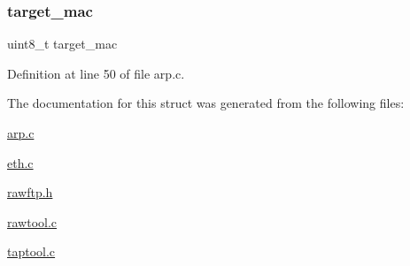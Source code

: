 \subsubsection{\texorpdfstring{target\+\_\+mac}{target\_mac}}
{\footnotesize\ttfamily uint8\+\_\+t target\+\_\+mac}



Definition at line 50 of file arp.\+c.



The documentation for this struct was generated from the following files\+:\begin{DoxyCompactItemize}
\item 
\hyperlink{arp_8c}{arp.\+c}\item 
\hyperlink{eth_8c}{eth.\+c}\item 
\hyperlink{rawftp_8h}{rawftp.\+h}\item 
\hyperlink{rawtool_8c}{rawtool.\+c}\item 
\hyperlink{taptool_8c}{taptool.\+c}\end{DoxyCompactItemize}
